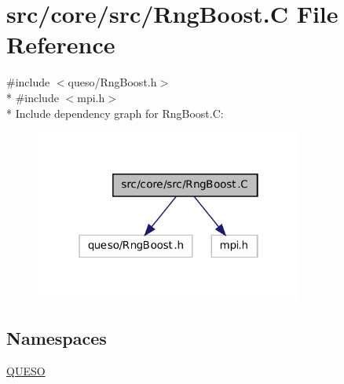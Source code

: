 \hypertarget{_rng_boost_8_c}{\section{src/core/src/\-Rng\-Boost.C File Reference}
\label{_rng_boost_8_c}
}
{\ttfamily \#include $<$queso/\-Rng\-Boost.\-h$>$}\\*
{\ttfamily \#include $<$mpi.\-h$>$}\\*
Include dependency graph for Rng\-Boost.\-C\-:
\nopagebreak
\begin{figure}[H]
\begin{center}
\leavevmode
\includegraphics[width=250pt]{_rng_boost_8_c__incl}
\end{center}
\end{figure}
\subsection*{Namespaces}
\begin{DoxyCompactItemize}
\item 
\hyperlink{namespace_q_u_e_s_o}{Q\-U\-E\-S\-O}
\end{DoxyCompactItemize}
